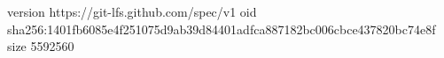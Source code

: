 version https://git-lfs.github.com/spec/v1
oid sha256:1401fb6085e4f251075d9ab39d84401adfca887182bc006cbce437820bc74e8f
size 5592560
